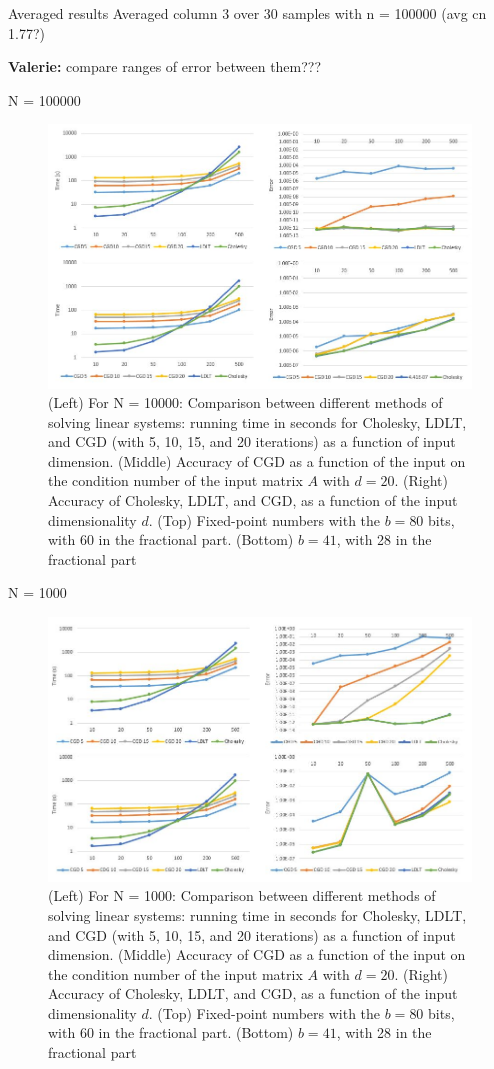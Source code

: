 \documentclass{article}
\theoremstyle{plain}
\theoremstyle{definition}
\theoremstyle{remark}
\newcommand{\vc}[1]{{\textcolor{lred}{\textbf{Valerie:} #1}}}
\begin{document}
Averaged results Averaged column 3 over 30 samples with n = 100000 (avg cn 1.77?)

\vc{compare ranges of error between them???}

N = 100000
\begin{figure}[h]
  \includegraphics[width=\linewidth]{results1.jpg}
  \caption{(Left) For N = 10000: Comparison between different methods of solving linear systems: running time in seconds for Cholesky, LDLT, and CGD (with 5, 10, 15, and 20 iterations) as a function of input dimension. (Middle) Accuracy of CGD as a function of the input on the condition number of the input matrix $A$ with $d = 20$. (Right) Accuracy of Cholesky, LDLT, and CGD, as a function of the input dimensionality $d$. (Top) Fixed-point numbers with the $b = 80$ bits, with 60 in the fractional part. (Bottom) $b = 41$, with 28 in the fractional part}
  \label{fig:result2}
\end{figure}

N = 1000
\begin{figure}[h]
  \includegraphics[width=\linewidth]{results2.jpg}
  \caption{(Left) For N = 1000: Comparison between different methods of solving linear systems: running time in seconds for Cholesky, LDLT, and CGD (with 5, 10, 15, and 20 iterations) as a function of input dimension. (Middle) Accuracy of CGD as a function of the input on the condition number of the input matrix $A$ with $d = 20$. (Right) Accuracy of Cholesky, LDLT, and CGD, as a function of the input dimensionality $d$. (Top) Fixed-point numbers with the $b = 80$ bits, with 60 in the fractional part. (Bottom) $b = 41$, with 28 in the fractional part}
  \label{fig:result2}
\end{figure}
\end{document}

